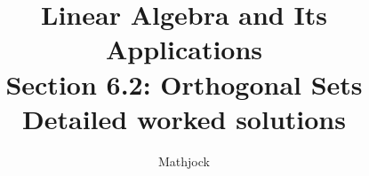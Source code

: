 
\title{\textbf{Linear Algebra and Its Applications}\\[0.3em]Section 6.2: Orthogonal Sets\\[0.3em]\large Detailed worked solutions}
\author{Mathjock}
\date{}

\maketitle
\bookinfo
\tableofcontents
\clearpage
\renewcommand{\thesection}{6.\arabic{section}}
\renewcommand{\theHsection}{6.\arabic{section}}
\setcounter{section}{1}


